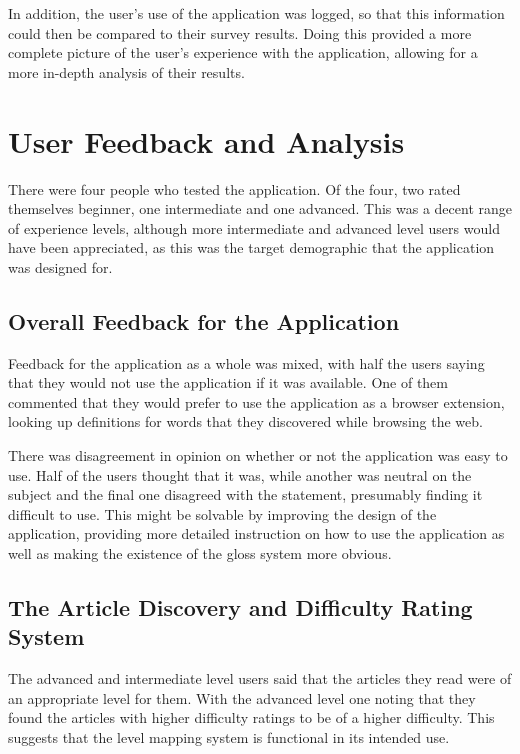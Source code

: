 In addition, the user's use of the application was logged, so that this information could then be compared to their survey results. Doing this provided a more complete picture of the user's experience with the application, allowing for a more in-depth analysis of their results. 

\section{User Feedback and Analysis}

There were four people who tested the application. Of the four, two rated themselves beginner, one intermediate and one advanced. This was a decent range of experience levels, although more intermediate and advanced level users would have been appreciated, as this was the target demographic that the application was designed for.

\subsection{Overall Feedback for the Application}

Feedback for the application as a whole was mixed, with half the users saying that they would not use the application if it was available. One of them commented that they would prefer to use the application as a browser extension, looking up definitions for words that they discovered while browsing the web.

There was disagreement in opinion on whether or not the application was easy to use. Half of the users thought that it was, while another was neutral on the subject and the final one disagreed with the statement, presumably finding it difficult to use. This might be solvable by improving the design of the application, providing more detailed instruction on how to use the application as well as making the existence of the gloss system more obvious.


\subsection{The Article Discovery and Difficulty Rating System}

The advanced and intermediate level users said that the articles they read were of an appropriate level for them. With the advanced level one noting that they found the articles with higher difficulty ratings to be of a higher difficulty. This suggests that the level mapping system is functional in its intended use.  

